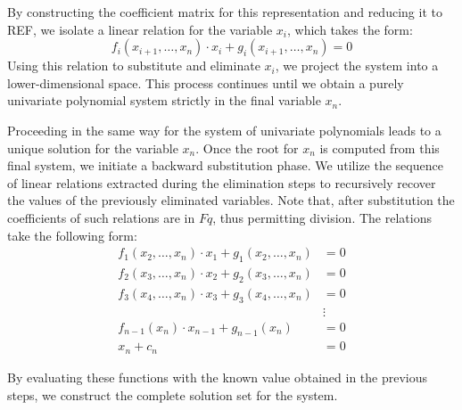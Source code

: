 By constructing the coefficient matrix for this representation and reducing it to REF, we isolate a linear relation for the variable $x_i$, which takes the form:
\begin{equation}
    f_i(x_{i+1}, \dots, x_n)\cdot x_i + g_i(x_{i+1}, \dots, x_n) = 0
    \label{eq:linear_relation_i}
\end{equation}
Using this relation to substitute and eliminate $x_i$, we project the system into a lower-dimensional space. This process continues until we obtain a purely univariate polynomial system strictly in the final variable $x_n$.

Proceeding in the same way for the system of univariate polynomials leads to a unique solution for the variable \(x_n\).
Once the root for $x_n$ is computed from this final system, we initiate a backward substitution phase. We utilize the sequence of linear relations extracted during the elimination steps to recursively recover the values of the previously eliminated variables. Note that, after substitution the coefficients of such relations are in \(Fq\), thus permitting division. The relations take the following form:
\begin{align*}
    f_1(x_2, \dots, x_n)\cdot x_1 + g_1(x_2, \dots, x_n) &= 0 \\
    f_2(x_3, \dots, x_n)\cdot x_2 + g_2(x_3, \dots, x_n) &= 0 \\
    f_3(x_4, \dots, x_n)\cdot x_3 + g_3(x_4, \dots, x_n) &= 0 \\
    &\vdots \nonumber \\
    f_{n-1}(x_n)\cdot x_{n-1} + g_{n-1}(x_n) &= 0 \\
    x_n + c_n &= 0
    \label{eq:backward_substitution}
\end{align*}

By evaluating these functions with the known value obtained in the previous steps, we construct the complete solution set for the system.